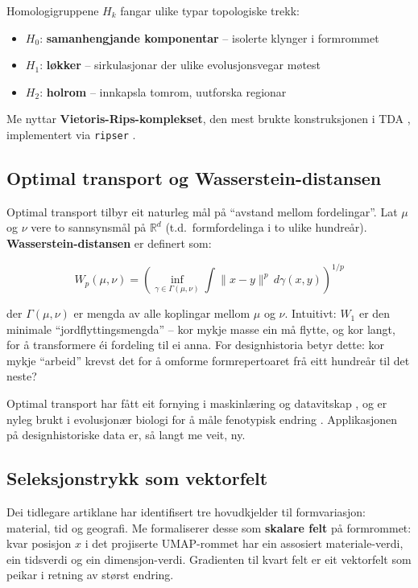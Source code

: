 \documentclass[10pt, a4paper, twocolumn]{article}
\begin{document}
Homologigruppene $H_k$ fangar ulike typar topologiske trekk:
\begin{itemize}
  \item $H_0$: \textbf{samanhengjande komponentar} -- isolerte klynger i formrommet
  \item $H_1$: \textbf{l\o kker} -- sirkulasjonar der ulike evolusjonsvegar m\o test
  \item $H_2$: \textbf{holrom} -- innkapsla tomrom, uutforska regionar
\end{itemize}

Me nyttar \textbf{Vietoris-Rips-komplekset}, den mest brukte konstruksjonen i TDA \citep{Edelsbrunner2010}, implementert via \texttt{ripser} \citep{Bauer2021}.


\subsection{Optimal transport og Wasserstein-distansen}

Optimal transport tilbyr eit naturleg m\aa l p\aa{} ``avstand mellom fordelingar''. Lat $\mu$ og $\nu$ vere to sannsynsm\aa l p\aa{} $\mathbb{R}^d$ (t.d.\ formfordelinga i to ulike hundre\aa r). \textbf{Wasserstein-distansen} er definert som:

\begin{equation}
W_p(\mu, \nu) = \left( \inf_{\gamma \in \Gamma(\mu, \nu)} \int \|x - y\|^p \, d\gamma(x, y) \right)^{1/p}
\label{eq:wasserstein}
\end{equation}

\noindent der $\Gamma(\mu, \nu)$ er mengda av alle koplingar mellom $\mu$ og $\nu$. Intuitivt: $W_1$ er den minimale ``jordflyttingsmengda'' -- kor mykje masse ein m\aa{} flytte, og kor langt, for \aa{} transformere \'{e}i fordeling til ei anna. For designhistoria betyr dette: kor mykje ``arbeid'' krevst det for \aa{} omforme formrepertoaret fr\aa{} eitt hundre\aa r til det neste?

Optimal transport har f\aa tt eit fornying i maskinl\ae ring og datavitskap \citep{Peyre2019}, og er nyleg brukt i evolusjon\ae r biologi for \aa{} m\aa le fenotypisk endring \citep{Schiebinger2019}. Applikasjonen p\aa{} designhistoriske data er, s\aa{} langt me veit, ny.


\subsection{Seleksjonstrykk som vektorfelt}

Dei tidlegare artiklane har identifisert tre hovudkjelder til formvariasjon: material, tid og geografi. Me formaliserer desse som \textbf{skalare felt} p\aa{} formrommet: kvar posisjon $x$ i det projiserte UMAP-rommet har ein assosiert materiale-verdi, ein tidsverdi og ein dimensjon-verdi. Gradienten til kvart felt er eit vektorfelt som peikar i retning av st\o rst endring.
\end{document}
